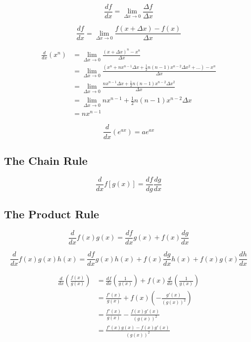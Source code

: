 \documentclass[]{article}
\begin{document}
\begin{equation*}
    \frac{df}{dx} = \lim_{\Delta x \to 0} \frac{\Delta f}{\Delta x}
\end{equation*}

\begin{equation*}
    \frac{df}{dx} = \lim_{\Delta x \to 0} \frac{f(x + \Delta x) - f(x)}{\Delta x}
\end{equation*}

\begin{align*}
    \frac{d}{dx}(x^{n}) &= \lim_{\Delta x \to 0} \frac{(x + \Delta x)^{n} - x^{n}}{\Delta x}\\
    &= \lim_{\Delta x \to 0} \frac{(x^{n} + n x^{n-1}\Delta x + \frac{1}{2}n(n-1)x^{n-2}\Delta x^{2} +\dots) - x^{n}}{\Delta x}\\
    &= \lim_{\Delta x \to 0} \frac{n x^{n-1}\Delta x + \frac{1}{2}n(n-1)x^{n-2}\Delta x^{2}}{\Delta x}\\
    &= \lim_{\Delta x \to 0} n x^{n-1} + \frac{1}{2}n(n-1)x^{n-2}\Delta x\\
    &= n x^{n-1}
\end{align*}

\begin{equation*}
    \frac{d}{dx}(e^{ax}) = ae^{ax}
\end{equation*}

\subsection{The Chain Rule}

\begin{equation*}
    \frac{d}{dx}f[g(x)] = \frac{df}{dg} \frac{dg}{dx}
\end{equation*}

\subsection{The Product Rule}

\begin{equation*}
    \frac{d}{dx} f(x)g(x) = \frac{df}{dx} g(x) + f(x)\frac{dg}{dx}
\end{equation*}

\begin{equation*}
    \frac{d}{dx} f(x)g(x)h(x) = \frac{df}{dx} g(x)h(x) + f(x)\frac{dg}{dx} h(x) + f(x)g(x) \frac{dh}{dx}
\end{equation*}

\begin{align*}
    \frac{d}{dx}\left(\frac{f(x)}{g(x)}\right) &= \frac{df}{dx}\left(\frac{1}{g(x)}\right) + f(x)\frac{d}{dx}\left(\frac{1}{g(x)}\right)\\
    &= \frac{f'(x)}{g(x)} + f(x)\left(- \frac{g'(x)}{(g(x))^2}\right)\\
    &= \frac{f'(x)}{g(x)} - \frac{f(x)g'(x)}{(g(x))^{2}}\\
    &= \frac{f'(x)g(x) - f(x)g'(x)}{(g(x))^{2}}
\end{align*}
\end{document}
